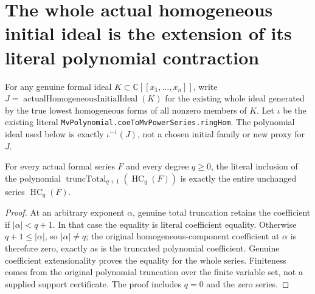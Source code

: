 \section{The whole actual homogeneous initial ideal is the extension of its literal polynomial contraction}

For any genuine formal ideal $K\subset\mathbb C[[x_1,\ldots,x_n]]$,
write $J=\operatorname{actualHomogeneousInitialIdeal}(K)$ for the
existing whole ideal generated by the true lowest homogeneous forms
of all nonzero members of $K$. Let $\iota$ be the existing literal
\texttt{MvPolynomial.coeToMvPowerSeries.ringHom}. The polynomial ideal
used below is exactly $\iota^{-1}(J)$, not a chosen initial family or
new proxy for $J$.

\begin{theorem}
\label{hir:actual-every-homogeneous-component-finite-polynomial}
\leanok
For every actual formal series $F$ and every degree $q\ge0$, the
literal inclusion of the polynomial
$\operatorname{truncTotal}_{q+1}(\operatorname{HC}_q(F))$ is exactly
the entire unchanged series $\operatorname{HC}_q(F)$.
\end{theorem}
\begin{proof}
At an arbitrary exponent $\alpha$, genuine total truncation retains
the coefficient if $|\alpha|<q+1$. In that case the equality is
literal coefficient equality. Otherwise $q+1\le|\alpha|$, so
$|\alpha|\ne q$; the original homogeneous-component coefficient at
$\alpha$ is therefore zero, exactly as is the truncated polynomial
coefficient. Genuine coefficient extensionality proves the equality
for the whole series. Finiteness comes from the original polynomial
truncation over the finite variable set, not a supplied support
certificate. The proof includes $q=0$ and the zero series.
\end{proof}

